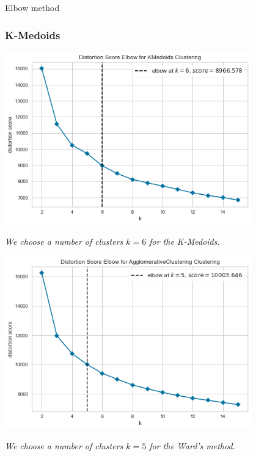 \documentclass[10pt]{beamer}
\begin{document}
\begin{frame}{Elbow method}
	\subsubsection{K-Medoids}
	\begin{minipage}{0.55\textwidth}
		\centering
		\includegraphics[width=0.8\textwidth]{../Images/FMedoidsElbow.png}
	\end{minipage}
	\begin{minipage}{0.3\textwidth}
		\itshape\scriptsize
		We choose a number of clusters $k=6$ for the K-Medoids.
	\end{minipage}
	\begin{minipage}{0.55\textwidth}
		\centering
		\includegraphics[width=0.8\textwidth]{../Images/FHierElbow.png}
	\end{minipage}
	\begin{minipage}{0.3\textwidth}
		\itshape\scriptsize
		We choose a number of clusters $k=5$ for the Ward's method.
	\end{minipage}
\end{frame}
\end{document}
